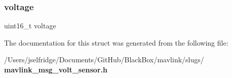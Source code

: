 \subsubsection{voltage}
{\footnotesize\ttfamily uint16\+\_\+t voltage}



The documentation for this struct was generated from the following file\+:\begin{DoxyCompactItemize}
\item 
/\+Users/jselfridge/\+Documents/\+Git\+Hub/\+Black\+Box/mavlink/slugs/\textbf{ mavlink\+\_\+msg\+\_\+volt\+\_\+sensor.\+h}\end{DoxyCompactItemize}
